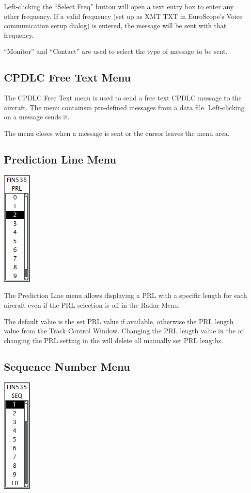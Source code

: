\documentclass[11pt,a4paper,oldfontcommands]{memoir}
\begin{document}
Left-clicking the “Select Freq” button will open a text entry box to enter any other frequency. If a valid frequency (set up as XMT TXT in EuroScope’s Voice communication setup dialog) is entered, the message will be sent with that frequency.

“Monitor” and “Contact” are used to select the type of message to be sent.

\subsection{CPDLC Free Text Menu}
\label{menu:dlftm}

The CPDLC Free Text menu is used to send a free text CPDLC message to the aircraft. The menu containsm pre-defined messages from a data file. Left-clicking on a message sends it.

The menu closes when a message is sent or the cursor leaves the menu area.

\subsection{Prediction Line Menu}
\label{menu:prl}
\includegraphics{img/prl.png}

The Prediction Line menu allows displaying a PRL with a specific length for each aircraft even if the PRL selection is off in the Radar Menu.

The default value is the set PRL value if available, otherwise the PRL length value from the Track Control Window. Changing the PRL length value in the \textit{} or changing the PRL setting in the \textit{} will delete all manually set PRL lengths.

\subsection{Sequence Number Menu}
\label{menu:seq}
\includegraphics{img/seq.png}
\end{document}
